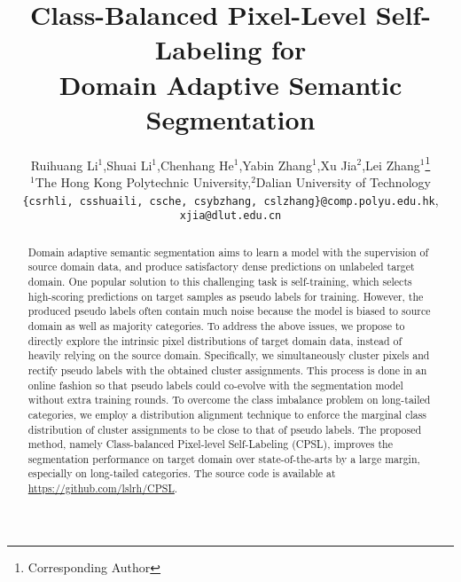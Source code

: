 \documentclass[10pt,twocolumn,letterpaper]{article}
\begin{document}
	
\title{Class-Balanced Pixel-Level Self-Labeling for \\ Domain Adaptive Semantic Segmentation}
	
	\author{Ruihuang Li$^1$,\quad Shuai Li$^1$,\quad Chenhang He$^1$,\quad Yabin Zhang$^1$,\quad Xu Jia$^2$,\quad Lei Zhang$^1$\thanks{Corresponding Author}\\
	$^1$The Hong Kong Polytechnic
University,\quad $^2$Dalian University of Technology\\
{\tt\small \{csrhli, csshuaili, csche, csybzhang, cslzhang\}@comp.polyu.edu.hk}, {\tt\small xjia@dlut.edu.cn} 
}
	


	\maketitle
	
\begin{abstract}
		Domain adaptive semantic segmentation aims to learn a model with the supervision of source domain data, and produce satisfactory dense predictions on unlabeled target domain. One popular solution to this challenging task is self-training, which selects high-scoring predictions on target samples as pseudo labels for training. However, the produced pseudo labels often contain much noise because the model is biased to source domain as well as majority categories. To address the above issues, we propose to directly explore the intrinsic pixel distributions of target domain data, instead of heavily relying on the source domain. Specifically, we simultaneously cluster pixels and rectify pseudo labels with the obtained cluster assignments. This process is done in an online fashion so that pseudo labels could co-evolve with the segmentation model without extra training rounds. To overcome the class imbalance problem on long-tailed categories, we employ a distribution alignment technique to enforce the marginal class distribution of cluster assignments to be close to that of pseudo labels. The proposed method, namely Class-balanced Pixel-level Self-Labeling (CPSL), improves the segmentation performance on target domain over state-of-the-arts by a large margin, especially on long-tailed categories. The source code is available at \url{https://github.com/lslrh/CPSL}. 


	\end{abstract}
\end{document}

